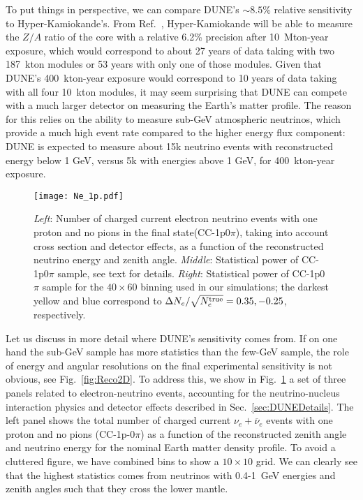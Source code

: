 To put things in perspective, we can compare DUNE's $\sim8.5\%$ relative sensitivity to Hyper-Kamiokande's.
From Ref.~\cite{Hyper-Kamiokande:2018ofw}, Hyper-Kamiokande will be able to measure the $Z/A$ ratio of the core with a relative 6.2\% precision after 10~Mton-year exposure, which would correspond to about 27 years of data taking with two 187~kton modules or 53 years with only one of those modules. 
Given that DUNE's 400~kton-year exposure would correspond to 10 years of data taking with all four 10~kton modules, it may seem surprising that DUNE can compete with a much larger detector on measuring the Earth's matter profile.
The reason for this relies on the ability to measure sub-GeV atmospheric neutrinos, which provide a much high event rate compared to the higher energy flux component: DUNE is expected to measure about 15k neutrino events with reconstructed energy below 1 GeV, versus 5k with energies above 1 GeV, for 400~kton-year exposure.

\begin{figure}[t]
\begin{center}
\texttt{[image: Ne\_1p.pdf]}
\caption{\emph{Left}: Number of charged current electron neutrino events with one proton and no pions in the final state(CC-1p0$\pi$), taking into account cross section and detector effects, as a function of the reconstructed neutrino energy and zenith angle. 
\emph{Middle}: Statistical power of CC-1p0$\pi$ sample, see text for details.
\emph{Right}: Statistical power of CC-1p0$\pi$ sample for the $40\times60$ binning used in our simulations; the darkest yellow and blue correspond to $\Delta N_e/\sqrt{N_e^{\rm true}}= 0.35, -0.25$, respectively.
 \label{fig:Evse1p}} 
\end{center}
\end{figure}
Let us discuss in more detail where DUNE's sensitivity comes from.
If on one hand the sub-GeV sample has more statistics than the few-GeV sample, the role of energy and angular resolutions on the final experimental sensitivity is not obvious, see Fig.~\ref{fig:Reco2D}.
To address this, we show in Fig.~\ref{fig:Evse1p} a set of three panels related to electron-neutrino events, accounting for the neutrino-nucleus interaction physics and detector effects described in Sec.~\ref{sec:DUNEDetails}.
The left panel shows the total number of charged current $\nu_e+\overline\nu_e$ events with one proton and no pions (CC-1p-0$\pi$) as a function of the reconstructed zenith angle and neutrino energy for the nominal Earth matter density profile.
To avoid a cluttered figure, we have combined bins to show a $10\times10$ grid.
We can clearly see that the highest statistics comes from neutrinos with 0.4-1~GeV energies and zenith angles such that they cross the lower mantle.

